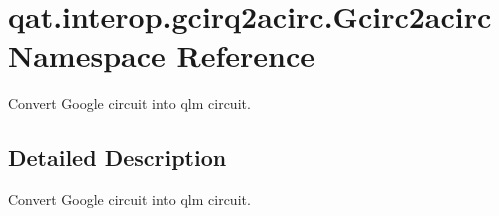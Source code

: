 \hypertarget{namespaceqat_1_1interop_1_1gcirq2acirc_1_1Gcirc2acirc}{\section{qat.\-interop.\-gcirq2acirc.\-Gcirc2acirc Namespace Reference}
\label{namespaceqat_1_1interop_1_1gcirq2acirc_1_1Gcirc2acirc}
}


Convert Google circuit into qlm circuit.  




\subsection{Detailed Description}
Convert Google circuit into qlm circuit. 